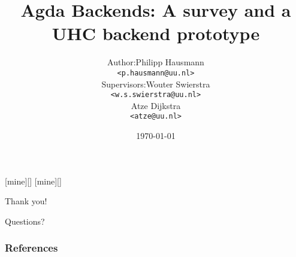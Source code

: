 \documentclass{beamer}
\title[Agda UHC Backend]{Agda Backends: A survey and a UHC backend prototype}
\date{\today}
\institute[Utrecht University] {
    Department of Information and Computing Sciences \\
    Utrecht University
}
\begin{document}
    \author[P. Hausmann]{
        \begin{tabular}{r@{ }l}
            Author:     & Philipp Hausmann \\
                        & \small{\texttt{<p.hausmann@uu.nl>}} \\[2ex]
            Supervisors: & Wouter Swierstra \\
                        & \small{\texttt{<w.s.swierstra@uu.nl>}} \\
                        & Atze Dijkstra \\
                        & \small{\texttt{<atze@uu.nl>}}
        \end{tabular}
    }

    [mine][]
    [mine][]

    \begin{frame}
        \titlepage
    \end{frame}



%    
%    
%    
%    
%    
%    


    \begin{frame}[plain]
        \begin{center}
            \par{\Huge{Thank you!}}
            \vspace{\baselineskip}
            \par{\Huge{Questions?}}


        \end{center}
    \end{frame}

    \begin{frame}[allowframebreaks]
        \frametitle{References}
        
        
    \end{frame}
\end{document}
